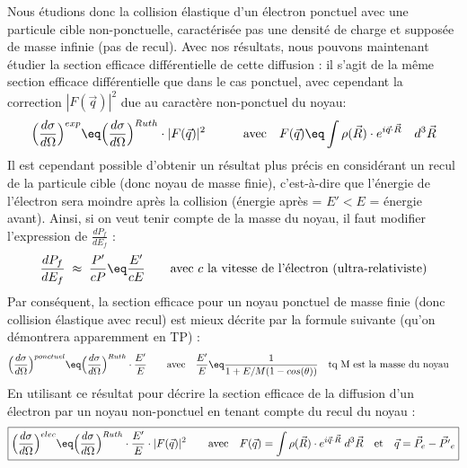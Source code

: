 Nous étudions donc la collision élastique d'un électron ponctuel avec une particule cible non-ponctuelle, caractérisée pas une densité de charge et supposée de masse infinie (pas de recul). Avec nos résultats, nous pouvons maintenant étudier la section efficace différentielle de cette diffusion : il s'agit de la même section efficace différentielle que dans le cas ponctuel, avec cependant la correction $|F(\vec{q})|^2$ due au caractère non-ponctuel du noyau:
\begin{equation*}
    \Big( \dfrac{d\sigma}{d\Omega} \Big)^{exp}
    \eq
    \Big( \dfrac{d\sigma}{d\Omega} \Big)^{Ruth}
    \cdot |F(\vec{q})|^2
    \qquad \quad \text{avec} \quad
    F(\vec{q}) \eq \int 
    \rho(\vec{R}) \cdot e^{i\vec{q} \cdot\vec{R}}
    \quad d^3\vec{R}
\end{equation*}
Il est cependant possible d'obtenir un résultat plus précis en considérant un recul de la particule cible (donc noyau de masse finie), c'est-à-dire que l'énergie de l'électron sera moindre après la collision (énergie après = $E'<E$ = énergie avant). Ainsi, si on veut tenir compte de la masse du noyau, il faut modifier l'expression de $\frac{dP_f}{dE_f}$ :
\begin{equation*}
    \dfrac{dP_f}{dE_f} \;\approx\; \dfrac{P'}{cP} \eq \dfrac{E'}{cE}
    \qquad \text{avec $c$ la vitesse de l'électron (ultra-relativiste)}
\end{equation*}
Par conséquent, la section efficace pour un noyau ponctuel de masse finie (donc collision élastique avec recul) est mieux décrite par la formule suivante (qu'on démontrera apparemment en TP) :
\begin{equation*}
    \Big( \dfrac{d\sigma}{d\Omega} \Big)^{ponctuel}
    \eq
    \Big( \dfrac{d\sigma}{d\Omega} \Big)^{Ruth}
    \cdot \dfrac{E'}{E}
    \qquad \text{avec} \quad
    \dfrac{E'}{E} \eq
    \dfrac{1}{1+E/M(1-cos(\theta))} 
    \quad \text{tq M est la masse du noyau} \quad 
\end{equation*}
En utilisant ce résultat pour décrire la section efficace de la diffusion d'un électron par un noyau non-ponctuel en tenant compte du recul du noyau :
\begin{equation*}
\boxed{
    \Big( \dfrac{d\sigma}{d\Omega} \Big)^{elec}
    \eq
    \Big( \dfrac{d\sigma}{d\Omega} \Big)^{Ruth}
    \cdot \dfrac{E'}{E}
    \cdot |F(\vec{q})|^2
    \qquad \text{avec} \quad 
     F(\vec{q}) = \int 
    \rho(\vec{R}) \cdot e^{i\vec{q} \cdot\vec{R}}
    \; d^3\vec{R}
    \quad \text{et} \quad
    \vec{q} = \vec{P}_e - \vec{P'}_e
}
\end{equation*}
